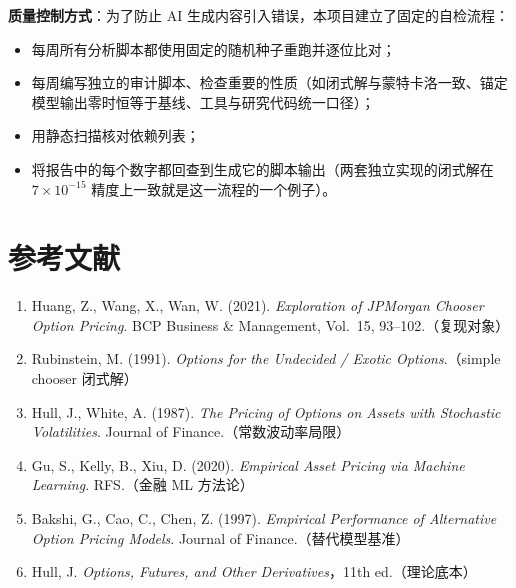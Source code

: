 \documentclass[11pt]{ctexart}
\begin{document}
\textbf{质量控制方式}：为了防止 AI 生成内容引入错误，本项目建立了固定的自检流程：
\begin{itemize}
  \item 每周所有分析脚本都使用固定的随机种子重跑并逐位比对；
  \item 每周编写独立的审计脚本、检查重要的性质（如闭式解与蒙特卡洛一致、锚定模型输出零时恒等于基线、工具与研究代码统一口径）；
  \item 用静态扫描核对依赖列表；
  \item 将报告中的每个数字都回查到生成它的脚本输出（两套独立实现的闭式解在 $7\times10^{-15}$ 精度上一致就是这一流程的一个例子）。
\end{itemize}

\section*{参考文献}
\begin{enumerate}
  \item Huang, Z., Wang, X., Wan, W. (2021). \textit{Exploration of JPMorgan Chooser Option Pricing}. BCP Business \& Management, Vol.~15, 93--102.（复现对象）
  \item Rubinstein, M. (1991). \textit{Options for the Undecided / Exotic Options}.（simple chooser 闭式解）
  \item Hull, J., White, A. (1987). \textit{The Pricing of Options on Assets with Stochastic Volatilities}. Journal of Finance.（常数波动率局限）
  \item Gu, S., Kelly, B., Xiu, D. (2020). \textit{Empirical Asset Pricing via Machine Learning}. RFS.（金融 ML 方法论）
  \item Bakshi, G., Cao, C., Chen, Z. (1997). \textit{Empirical Performance of Alternative Option Pricing Models}. Journal of Finance.（替代模型基准）
  \item Hull, J. \textit{Options, Futures, and Other Derivatives}，11th ed.（理论底本）
\end{enumerate}
\end{document}
